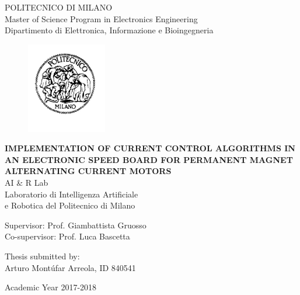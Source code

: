 \thispagestyle{empty}
\vspace*{-1.5cm} \bfseries{
\begin{center}
  \large
  POLITECNICO DI MILANO\\
  \normalsize
  Master of Science Program in Electronics Engineering\\
  Dipartimento di Elettronica, Informazione e Bioingegneria\\
  \begin{figure}[htbp]
    \begin{center}
      \includegraphics[width=3.5cm]{./pictures/logopm}
    \end{center}
  \end{figure}
  \vspace*{0.3cm} \LARGE



  \textbf{IMPLEMENTATION OF CURRENT CONTROL ALGORITHMS IN AN ELECTRONIC SPEED BOARD FOR PERMANENT MAGNET ALTERNATING CURRENT MOTORS}\\



  \vspace*{.75truecm} \large
  AI \& R Lab \\
  Laboratorio di Intelligenza Artificiale \\
  e Robotica del Politecnico di Milano
\end{center}
\vspace*{3.0cm} \large
\begin{flushleft}


  Supervisor: Prof. Giambattista Gruosso \\
  Co-supervisor: Prof. Luca Bascetta 

\end{flushleft}
\vspace*{1.0cm}
\begin{flushright}


  Thesis submitted by:\\ Arturo Montúfar Arreola, ID 840541 \\ 


\end{flushright}
\vspace*{0.5cm}
\begin{center}



  Academic Year 2017-2018
\end{center} \clearpage
}

